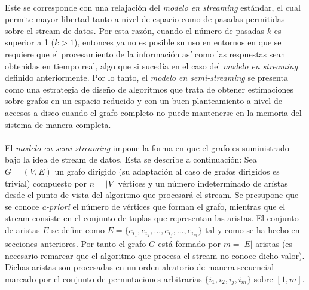 \documentclass{subfiles}
\begin{document}
      \paragraph{}
      Este se corresponde con una relajación del \emph{modelo en streaming} estándar, el cual permite mayor libertad tanto a nivel de espacio como de pasadas permitidas sobre el stream de datos. Por esta razón, cuando el número de pasadas  $k$ es superior a 1 ($k > 1$), entonces ya no es posible su uso en entornos en que se requiere que el procesamiento de la información así como las respuestas sean obtenidas en tiempo real, algo que si sucedía en el caso del \emph{modelo en streaming} definido anteriormente. Por lo tanto, el \emph{modelo en semi-streaming} se presenta como una estrategia de diseño de algoritmos que trata de obtener estimaciones sobre grafos en un espacio reducido y con un buen planteamiento a nivel de accesos a disco cuando el grafo completo no puede mantenerse en la memoria del sistema de manera completa.

      \paragraph{}
      El \emph{modelo en semi-streaming} impone la forma en que el grafo es suministrado bajo la idea de stream de datos. Esta se describe a continuación: Sea $G = (V, E)$ un grafo dirigido (su adaptación al caso de grafos dirigidos es trivial) compuesto por $n = |V|$ vértices y un número indeterminado de arístas desde el punto de vista del algoritmo que procesará el stream. Se presupone que se conoce \emph{a-priori} el número de vértices que forman el grafo, mientras que el stream consiste en el conjunto de tuplas que representan las aristas. El conjunto de aristas $E$ se define como $E = \{ e_{i_1}, e_{i_2}, ..., e_{i_j}, ..., e_{i_m} \}$ tal y como se ha hecho en secciones anteriores. Por tanto el grafo $G$ está formado por $m = |E|$ aristas (es necesario remarcar que el algoritmo que procesa el stream no conoce dicho valor). Dichas aristas son procesadas en un orden aleatorio de manera secuencial marcado por el conjunto de permutaciones arbitrarias $\{ i_1, i_2, i_j, i_m \}$ sobre $[1, m]$.
\end{document}
